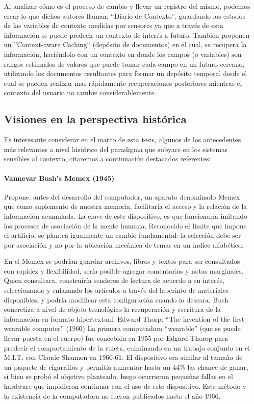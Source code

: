 Al analizar cómo es el proceso de cambio y llevar un registro del mismo, podemos
crear
lo que dichos autores llaman: “Diario de Contexto”, guardando los estados de las
variables de contexto medidas por sensores ya que a través de esta información
se puede
predecir un contexto de interés a futuro. También proponen un ''Context-aware
Caching``
(depósito de documentos) en el cual, se recupera la información, haciéndolo con
un
contexto en donde los campos (o variables) son rangos estimados de valores que
puede
tomar cada campo en un futuro cercano, utilizando los documentos resultantes
para
formar un depósito temporal desde el cual se pueden realizar mas rápidamente
recuperaciones posteriores mientras el contexto del usuario no cambie
considerablemente.

\subsection {Visiones en la perspectiva histórica}
 
Es interesante considerar en el marco de esta tesis, algunos de los
antecedentes más
relevantes a nivel histórico del paradigma que subyace en los sistemas sensibles
al
contexto, citaremos a continuación destacados referentes:


\paragraph {Vannevar Bush's Memex (1945)}

Propone, antes del desarrollo del computador, un aparato denominado Memex que
como
suplemento de nuestra memoria, facilitaría el acceso y la relación de la
información
acumulada. La clave de este dispositivo, es que funcionaría imitando los
procesos de
asociación de la mente humana. Reconocido el límite que impone el artificio, se
plantea
igualmente un cambio fundamental: la selección debe ser por asociación y no por
la
ubicación mecánica de temas en un índice alfabético.

En el Memex se podrían guardar archivos, libros y textos para ser consultados
con
rapidez y flexibilidad, sería posible agregar comentarios y notas marginales.
Quien
consultara, construiría senderos de lectura de acuerdo a su interés,
seleccionando y
enlazando los artículos a través del laberinto de materiales disponibles, y
podría
modificar esta configuración cuando lo deseara. Bush concretiza a nivel de
objeto
tecnológico la recuperación y escritura de la información en formato
hipertextual.
Edward Thorp: “The invention of the first wearable computer” (1960)
La primera computadora “wearable” (que se puede llevar puesta en el cuerpo) fue
concebida en 1955 por Edgard Thorop para predecir el comportamiento de la
ruleta,
culminando en un trabajo conjunto en el M.I.T. con Claude Shannon en 1960-61. El
dispositivo era similar al tamaño de un paquete de cigarrillos y permitía
aumentar hasta
un 44\% las chance de ganar, si bien se probó el objetivo planteado, luego
ocurrieron
pequeñas fallas en el hardware que impidieron continuar con el uso de este
dispositivo.
Este método y la existencia de la computadora no fueron publicados hasta el año
1966.


